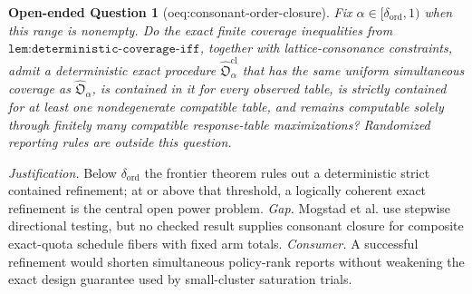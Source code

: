 \documentclass{article}
\newtheorem{openendedquestion}{Open-ended Question}
\begin{document}
\begin{openendedquestion}[oeq:consonant-order-closure]\label{oeq:consonant-order-closure}
Fix \(\alpha\in[\delta_{\mathrm{ord}},1)\) when this range is nonempty. Do the exact finite coverage inequalities from \(\texttt{lem:deterministic-coverage-iff}\), together with lattice-consonance constraints, admit a deterministic exact procedure \(\widehat{\mathfrak O}^{\mathrm{cl}}_{\alpha}\) that has the same uniform simultaneous coverage as \(\widehat{\mathfrak O}_{\alpha}\), is contained in it for every observed table, is strictly contained for at least one nondegenerate compatible table, and remains computable solely through finitely many compatible response-table maximizations? Randomized reporting rules are outside this question.
\end{openendedquestion}
\par\smallskip\noindent \textit{Justification.} Below \(\delta_{\mathrm{ord}}\) the frontier theorem rules out a deterministic strict contained refinement; at or above that threshold, a logically coherent exact refinement is the central open power problem. \textit{Gap.} Mogstad et al. use stepwise directional testing, but no checked result supplies consonant closure for composite exact-quota schedule fibers with fixed arm totals. \textit{Consumer.} A successful refinement would shorten simultaneous policy-rank reports without weakening the exact design guarantee used by small-cluster saturation trials.
\end{document}
